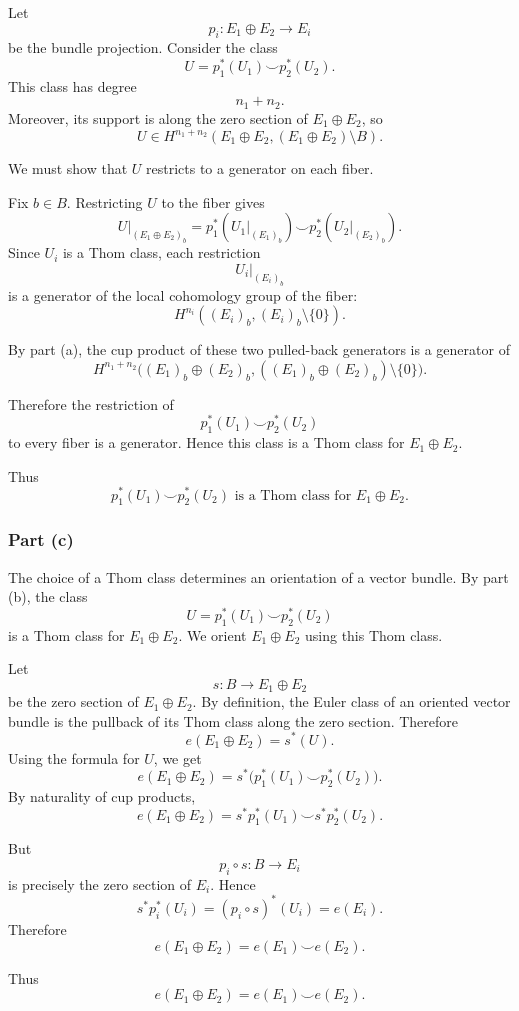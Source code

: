 \documentclass[12pt,a4paper]{article}
\theoremstyle{notespace}
\begin{document}
Let
\[
p_i:E_1\oplus E_2\to E_i
\]
be the bundle projection. Consider the class
\[
U
=
p_1^*(U_1)\smile p_2^*(U_2).
\]
This class has degree
\[
n_1+n_2.
\]
Moreover, its support is along the zero section of \(E_1\oplus E_2\), so
\[
U\in H^{n_1+n_2}(E_1\oplus E_2,(E_1\oplus E_2)\setminus B).
\]

We must show that \(U\) restricts to a generator on each fiber.

Fix \(b\in B\). Restricting \(U\) to the fiber gives
\[
U|_{(E_1\oplus E_2)_b}
=
p_1^*(U_1|_{(E_1)_b})
\smile
p_2^*(U_2|_{(E_2)_b}).
\]
Since \(U_i\) is a Thom class, each restriction
\[
U_i|_{(E_i)_b}
\]
is a generator of the local cohomology group of the fiber:
\[
H^{n_i}((E_i)_b,(E_i)_b\setminus\{0\}).
\]

By part (a), the cup product of these two pulled-back generators is a generator of
\[
H^{n_1+n_2}
\bigl(
(E_1)_b\oplus (E_2)_b,
((E_1)_b\oplus (E_2)_b)\setminus\{0\}
\bigr).
\]

Therefore the restriction of
\[
p_1^*(U_1)\smile p_2^*(U_2)
\]
to every fiber is a generator. Hence this class is a Thom class for
\(E_1\oplus E_2\).

Thus
\[
\boxed{
	p_1^*(U_1)\smile p_2^*(U_2)
	\text{ is a Thom class for }E_1\oplus E_2.
}
\]

\subsubsection*{Part (c)}

The choice of a Thom class determines an orientation of a vector bundle. By part
(b), the class
\[
U
=
p_1^*(U_1)\smile p_2^*(U_2)
\]
is a Thom class for \(E_1\oplus E_2\). We orient \(E_1\oplus E_2\) using this Thom
class.

Let
\[
s:B\to E_1\oplus E_2
\]
be the zero section of \(E_1\oplus E_2\). By definition, the Euler class of an
oriented vector bundle is the pullback of its Thom class along the zero section.
Therefore
\[
e(E_1\oplus E_2)
=
s^*(U).
\]
Using the formula for \(U\), we get
\[
e(E_1\oplus E_2)
=
s^*\bigl(p_1^*(U_1)\smile p_2^*(U_2)\bigr).
\]
By naturality of cup products,
\[
e(E_1\oplus E_2)
=
s^*p_1^*(U_1)\smile s^*p_2^*(U_2).
\]

But
\[
p_i\circ s:B\to E_i
\]
is precisely the zero section of \(E_i\). Hence
\[
s^*p_i^*(U_i)
=
(p_i\circ s)^*(U_i)
=
e(E_i).
\]
Therefore
\[
e(E_1\oplus E_2)
=
e(E_1)\smile e(E_2).
\]

Thus
\[
\boxed{
	e(E_1\oplus E_2)=e(E_1)\smile e(E_2).
}
\]
\end{document}
